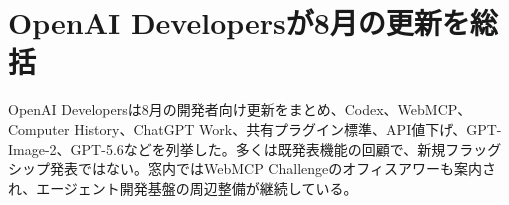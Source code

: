 \section{OpenAI Developersが8月の更新を総括}
OpenAI Developersは8月の開発者向け更新をまとめ、Codex、WebMCP、Computer History、ChatGPT Work、共有プラグイン標準、API値下げ、GPT-Image-2、GPT-5.6などを列挙した。多くは既発表機能の回顧で、新規フラッグシップ発表ではない。窓内ではWebMCP Challengeのオフィスアワーも案内され、エージェント開発基盤の周辺整備が継続している。
